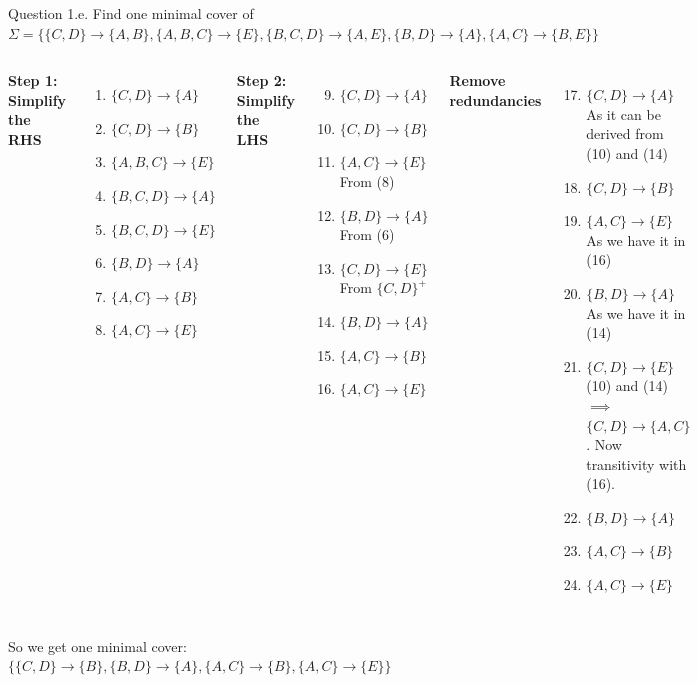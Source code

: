 \documentclass{beamer}
\begin{document}
\begin{frame}[fragile]{Question 1.e.}
\scriptsize
Find one minimal cover of $\Sigma = \{\{C, D\} \to \{A,B\},\{A,B,C\} \to \{E\},\{B,C,D\} \to \{A,E\},\{B,D\} \to \{A\},\{A,C\} \to \{B,E\}\}$
\tiny
\vspace{0.1cm}
\begin{columns}
\pause
    \textbf{Step 1: Simplify the RHS}
    \begin{enumerate}
        \item $\{C,D\}\to \{A\}$
        \item $\{C,D\}\to \{B\}$
        \item $\{A,B,C\}\to \{E\}$
        \item $\{B,C,D\} \to \{A\}$
        \item $\{B,C,D\} \to \{E\}$
        \item $\{B,D\}\to \{A\}$
        \item $\{A,C\}\to \{B\}$
        \item $\{A,C\}\to\{E\}$
    \end{enumerate}
    \pause
    \textbf{Step 2: Simplify the LHS}
    \begin{enumerate}
    \setcounter{enumi}{8}
        \item $\{C,D\}\to \{A\}$
        \item $\{C,D\}\to \{B\}$
        \item $\{A,C\}\to \{E\}$ From (8)
        \item $\{B,D\}\to \{A\}$ From (6)
        \item $\{C,D\}\to \{E\}$ From $\{C,D\}^+$
        \item $\{B,D\}\to \{A\}$
        \item $\{A,C\}\to \{B\}$
        \item $\{A,C\}\to\{E\}$
    \end{enumerate}
    \pause
    \textbf{Remove redundancies}
    \begin{enumerate}
    \setcounter{enumi}{16}
        \item \sout{$\{C,D\}\to \{A\}$} As it can be derived from (10) and (14)
        \item $\{C,D\}\to \{B\}$
        \item \sout{$\{A,C\}\to \{E\}$} As we have it in (16)
        \item \sout{$\{B,D\}\to \{A\}$} As we have it in (14)
        \item \sout{$\{C,D\}\to \{E\}$} (10) and (14) $\implies$ $\{C,D\} \to \{A,C\}$. Now transitivity with (16).
        \item $\{B,D\}\to \{A\}$
        \item $\{A,C\}\to \{B\}$
        \item $\{A,C\}\to\{E\}$
    \end{enumerate}
\end{columns}
\normalsize
So we get one minimal cover: $\{\{C,D\}\to\{B\}, \{B,D\}\to \{A\}, \{A,C\}\to\{B\}, \{A,C\}\to \{E\}\}$
\end{frame}
\end{document}
